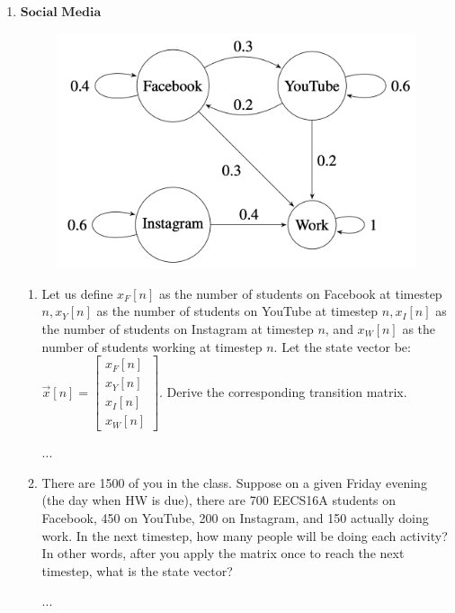 \documentclass[11pt]{article}
\begin{document}
\begin{enumerate}
   \newpage
   \item $\textbf{Social Media}$
       \begin{figure}[h]
        \centering
        \includegraphics[scale=0.25]{markov_chain}
    \end{figure}
   \begin{enumerate}
       \item Let us define $x_F[n]$ as the number of students on Facebook at timestep $n, x_Y[n]$ as the number of students on YouTube at timestep $n, x_I[n]$ as the number of students on Instagram at timestep $n$, and $x_W[n]$ as the number of students working at timestep $n$. Let the state vector be: $\vec x[n] = \begin{bmatrix}
                                        x_F[n] \\
                                        x_Y[n] \\
                                        x_I[n] \\
                                        x_W[n]    
                                    \end{bmatrix}
       $. Derive the corresponding transition matrix.
    \begin{Answer}
        ...
    \end{Answer}
    
    
    \item There are 1500 of you in the class. Suppose on a given Friday evening (the day when HW is due), there are 700 EECS16A students on Facebook, 450 on YouTube, 200 on Instagram, and 150 actually doing work. In the next timestep, how many people will be doing each activity? In other words, after you apply the matrix once to reach the next timestep, what is the state vector?
    \begin{Answer}
        ...
    \end{Answer}
    

\end{enumerate}
\end{enumerate}
\end{document}
